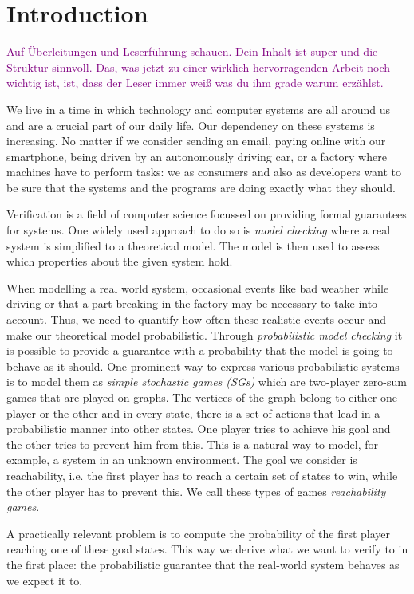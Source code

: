 \chapter{Introduction} \label{ch:intro}

\textcolor{purple}{Auf Überleitungen und Leserführung schauen. Dein Inhalt ist super und die Struktur sinnvoll. Das, was jetzt zu einer wirklich hervorragenden Arbeit noch wichtig ist, ist, dass der Leser immer weiß was du ihm grade warum erzählst.}

We live in a time in which technology and computer systems are all around us and are a crucial part of our daily life. 
Our dependency on these systems is increasing. 
No matter if we consider sending an email, paying online with our smartphone, being driven by an autonomously driving car, or a factory where machines have to perform tasks: 
we as consumers and also as developers want to be sure that the systems and the programs are doing exactly what they should.

Verification is a field of computer science focussed on providing formal guarantees for systems. 
One widely used approach to do so is \emph{model checking} where a real system is simplified to a theoretical model.
The model is then used to assess which properties about the given system hold.

When modelling a real world system, occasional events like bad weather while driving or that a part breaking in the factory may be necessary to take into account. 
Thus, we need to quantify how often these realistic events occur and make our theoretical model probabilistic. 
Through \emph{probabilistic model checking} it is possible to provide a guarantee with a probability that the model is going to behave as it should. 
One prominent way to express various probabilistic systems is to model them as \emph{simple stochastic games (SGs)} which are two-player zero-sum games that are played on graphs. 
The vertices of the graph belong to either one player or the other and in every state, there is a set of actions that lead in a probabilistic manner into other states. 
One player tries to achieve his goal and the other tries to prevent him from this. This is a natural way to model, for example, a system in an unknown environment.
The goal we consider is reachability, i.e. the first player has to reach a certain set of states to win, while the other player has to prevent this. 
We call these types of games \emph{reachability games}.

A practically relevant problem is to compute the probability of the first player reaching one of these goal states. 
This way we derive what we want to verify to in the first place: 
the probabilistic guarantee that the real-world system behaves as we expect it to.

